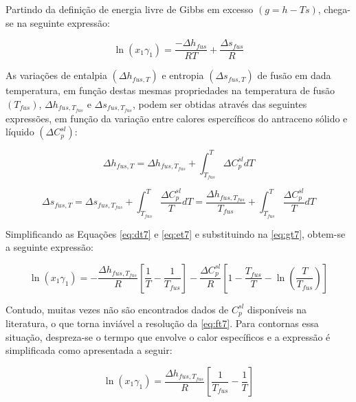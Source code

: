 Partindo da definição de energia livre de Gibbs em excesso $\left(g = h -
Ts\right)$, chega-se na seguinte expressão:

\begin{equation}\label{eq:gt7}
\ln\left( x_1\gamma_1 \right) = \frac{-\Delta h_{fus}}{RT} + \frac{\Delta
s_{fus}}{R}
\end{equation}

As variações de entalpia $\left( \Delta h_{fus,T} \right)$ e entropia
$\left(\Delta s_{fus,T}\right)$ de fusão em dada temperatura, em função destas
mesmas propriedades na temperatura de fusão $\left(T_{fus}\right)$, $\Delta
h_{fus,T_{fus}}$ e $\Delta s_{fus,T_{fus}}$, podem ser obtidas através das
seguintes expressões, em função da variação entre calores espercíficos do
antraceno sólido e líquido $\left(\Delta C_p^{sl}\right)$:

\begin{equation}\label{eq:dt7}
\Delta h_{fus,T} = \Delta h_{fus,T_{fus}} + \int_{T_{fus}}^{T}\Delta C_p^{sl}dT
\end{equation}

\begin{equation}\label{eq:et7}
\Delta s_{fus,T} = \Delta s_{fus,T_{fus}} + \int_{T_{fus}}^{T}\frac{\Delta
C_p^{sl}}{T}dT = \frac{\Delta h_{fus,T_{fus}}}{T_{fus}} + \int_{T_{fus}}^{T}\frac{\Delta
C_p^{sl}}{T}dT
\end{equation}

Simplificando as Equações \ref{eq:dt7} e  \ref{eq:et7} e substituindo na
\autoref{eq:gt7}, obtem-se a seguinte expressão:

\begin{equation}\label{eq:ft7}
\ln\left(x_1\gamma_1\right) =-\frac{\Delta
h_{fus,T_{fus}}}{R}\left[\frac{1}{T}-\frac{1}{T_{fus}}\right] -\frac{\Delta
C_p^{sl}}{R}\left[1-\frac{T_{fus}}{T}-\ln\left(\frac{T}{T_{fus}} \right)
\right]
\end{equation}

Contudo, muitas vezes não são encontrados dados de $C_p^{sl}$ disponíveis na
literatura, o que torna inviável a resolução da \autoref{eq:ft7}. Para contornas
essa situação, despreza-se o termpo que envolve o calor específicos e a expressão é
simplificada como apresentada a seguir:

\begin{equation}\label{eq:ht7}
\ln\left(x_1\gamma_1\right) = \frac{\Delta
h_{fus,T_{fus}}}{R}\left[\frac{1}{T_{fus}} - \frac{1}{T}\right]
\end{equation}


